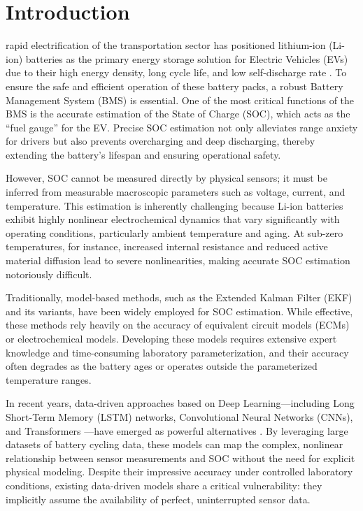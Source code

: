 \documentclass[journal]{IEEEtran}
\begin{document}
\section{Introduction}
 rapid electrification of the transportation sector has positioned lithium-ion (Li-ion) batteries as the primary energy storage solution for Electric Vehicles (EVs) due to their high energy density, long cycle life, and low self-discharge rate \cite{hu2012battery}. To ensure the safe and efficient operation of these battery packs, a robust Battery Management System (BMS) is essential. One of the most critical functions of the BMS is the accurate estimation of the State of Charge (SOC), which acts as the ``fuel gauge'' for the EV. Precise SOC estimation not only alleviates range anxiety for drivers but also prevents overcharging and deep discharging, thereby extending the battery's lifespan and ensuring operational safety.

However, SOC cannot be measured directly by physical sensors; it must be inferred from measurable macroscopic parameters such as voltage, current, and temperature. This estimation is inherently challenging because Li-ion batteries exhibit highly nonlinear electrochemical dynamics that vary significantly with operating conditions, particularly ambient temperature and aging. At sub-zero temperatures, for instance, increased internal resistance and reduced active material diffusion lead to severe nonlinearities, making accurate SOC estimation notoriously difficult.

Traditionally, model-based methods, such as the Extended Kalman Filter (EKF) and its variants, have been widely employed for SOC estimation. While effective, these methods rely heavily on the accuracy of equivalent circuit models (ECMs) or electrochemical models. Developing these models requires extensive expert knowledge and time-consuming laboratory parameterization, and their accuracy often degrades as the battery ages or operates outside the parameterized temperature ranges.

In recent years, data-driven approaches based on Deep Learning---including Long Short-Term Memory (LSTM) networks, Convolutional Neural Networks (CNNs), and Transformers \cite{vaswani2017attention}---have emerged as powerful alternatives \cite{chemali2017state, hannan2017review}. By leveraging large datasets of battery cycling data, these models can map the complex, nonlinear relationship between sensor measurements and SOC without the need for explicit physical modeling. Despite their impressive accuracy under controlled laboratory conditions, existing data-driven models share a critical vulnerability: they implicitly assume the availability of perfect, uninterrupted sensor data.
\end{document}
